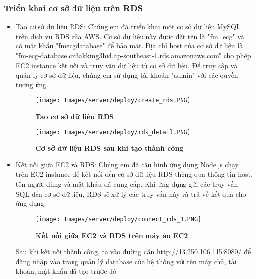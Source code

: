 \subsubsection{Triển khai cơ sở dữ liệu trên RDS}
\begin{itemize}
  \item Tạo cơ sở dữ liệu RDS: Chúng em đã triển khai một cơ sở dữ liệu MySQL trên dịch vụ RDS của AWS. Cơ sở dữ liệu này được đặt tên là "fm\_ecg" và có mật khẩu "fmecgdatabase" để bảo mật. Địa chỉ host của cơ sở dữ liệu là "fm-ecg-database.cx3akkmg3hid.ap-southeast-1.rds.amazonaws.com" cho phép EC2 instance kết nối và truy vấn dữ liệu từ cơ sở dữ liệu. Để truy cập và quản lý cơ sở dữ liệu, chúng em sử dụng tài khoản "admin" với các quyền tương ứng.
  
  \begin{figure}[H]
    \centering
    \texttt{[image: Images/server/deploy/create\_rds.PNG]}
    \caption[Tạo cơ sở dữ liệu RDS]{\bfseries \fontsize{12pt}{0pt}
    \selectfont Tạo cơ sở dữ liệu RDS}
    \label{create_rds} %
  \end{figure}


  \begin{figure}[H]
    \centering
    \texttt{[image: Images/server/deploy/rds\_detail.PNG]}
    \caption[Cơ sở dữ liệu RDS sau khi tạo thành công]{\bfseries \fontsize{12pt}{0pt}
    \selectfont Cơ sở dữ liệu RDS sau khi tạo thành công}
    \label{rds_detail} %
  \end{figure}

  \item Kết nối giữa EC2 và RDS: Chúng em đã cấu hình ứng dụng Node.js chạy trên EC2 instance để kết nối đến cơ sở dữ liệu RDS thông qua thông tin host, tên người dùng và mật khẩu đã cung cấp. Khi ứng dụng gửi các truy vấn SQL đến cơ sở dữ liệu, RDS sẽ xử lý các truy vấn này và trả về kết quả cho ứng dụng.
  

  \begin{figure}[H]
    \centering
    \texttt{[image: Images/server/deploy/connect\_rds\_1.PNG]}
    \caption[Kết nối giữa EC2 và RDS trên máy ảo EC2]{\bfseries \fontsize{12pt}{0pt}
    \selectfont Kết nối giữa EC2 và RDS trên máy ảo EC2}
    \label{rds_detail} %
  \end{figure}

  Sau khi kết nối thành công, ta vào đường dẫn \underline{http://13.250.106.115:8080/} để đăng nhập vào trang quản lý database của hệ thống với tên máy chủ, tài khoản, mật khẩu đã tạo trước đó



\end{itemize}
